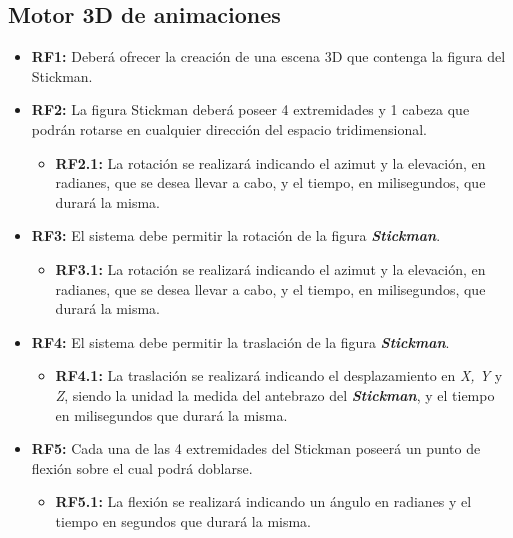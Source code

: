       \subsection{Motor 3D de animaciones}
      \begin{itemize}
         \item \textbf{RF1:} Deberá ofrecer la creación de una escena 3D que contenga la figura del Stickman.
         \item \textbf{RF2:} La figura Stickman deberá poseer 4 extremidades y 1 cabeza que podrán rotarse en cualquier dirección del 
               espacio tridimensional.
               \begin{itemize}
                  \item \textbf{RF2.1:} La rotación se realizará indicando el azimut y la elevación, en radianes, que se desea llevar a cabo,
                        y el tiempo, en milisegundos, que durará la misma.
               \end{itemize}
         \item \textbf{RF3:} El sistema debe permitir la rotación de la figura \textbf{\textit{Stickman}}.
               \begin{itemize}
                  \item \textbf{RF3.1:} La rotación se realizará indicando el azimut y la elevación, en radianes, que se desea llevar a
                        cabo, y el tiempo, en milisegundos, que durará la misma.
               \end{itemize}
         \item \textbf{RF4:} El sistema debe permitir la traslación de la figura \textbf{\textit{Stickman}}.
               \begin{itemize}
                  \item \textbf{RF4.1:} La traslación se realizará indicando el desplazamiento en \textit{X, Y} y \textit{Z}, siendo la unidad
                     la medida del antebrazo del \textbf{\textit{Stickman}}, y el tiempo en milisegundos que durará la misma.
               \end{itemize}
         \item \textbf{RF5:} Cada una de las 4 extremidades del Stickman poseerá un punto de flexión sobre el cual podrá doblarse.
               \begin{itemize}
                  \item \textbf{RF5.1:} La flexión se realizará indicando un ángulo en radianes y el tiempo en segundos que durará la misma.
               \end{itemize}

\end{itemize}
